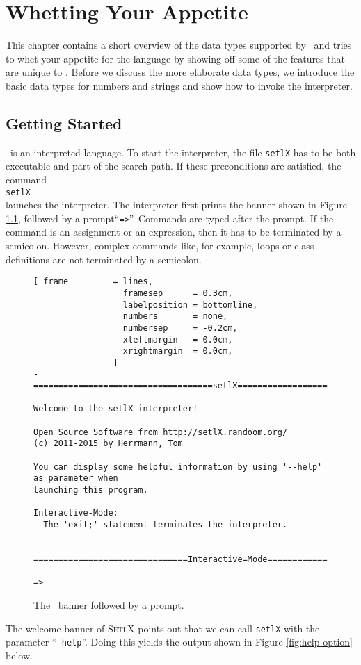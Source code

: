 \chapter{Whetting Your Appetite}
This chapter contains a short overview of the data types supported by
\setlx\ and tries to whet your appetite for the language by showing off some of
the features that are unique to \setlx.  Before we discuss the more elaborate data types,
we introduce the basic data types for numbers and strings and show how to invoke the interpreter.


\section{Getting Started}
\setlx\ is an interpreted language.  To start the interpreter,  the file
\texttt{setlX} has to be both executable and part of the search path.   If these
preconditions are satisfied, the command
\\[0.2cm]
\hspace*{1.3cm}
\texttt{setlX}
\\[0.2cm]
 launches the interpreter.  The interpreter first prints the banner shown in Figure
\ref{fig:banner}, followed by a prompt``\texttt{=>}''.  Commands are typed after the prompt.    
If the command is an assignment or an expression, then it has to be terminated by a semicolon.
However, complex commands like, for example, loops or class definitions are not terminated by 
a semicolon. 

\begin{figure}[!ht]
\centering
\begin{Verbatim}[ frame         = lines, 
                  framesep      = 0.3cm, 
                  labelposition = bottomline,
                  numbers       = none,
                  numbersep     = -0.2cm,
                  xleftmargin   = 0.0cm,
                  xrightmargin  = 0.0cm,
                ]
-====================================setlX=============================v2.4.0=-

Welcome to the setlX interpreter!

Open Source Software from http://setlX.randoom.org/
(c) 2011-2015 by Herrmann, Tom

You can display some helpful information by using '--help' as parameter when
launching this program.

Interactive-Mode:
  The 'exit;' statement terminates the interpreter.

-===============================Interactive=Mode==============================-

=> 
\end{Verbatim}
\vspace*{-0.3cm}
\caption{The \setlx\ banner followed by a prompt.}
\label{fig:banner}
\end{figure}
\noindent
The welcome banner of \textsc{SetlX} points out that we can call \texttt{setlX} with the parameter 
``\texttt{--help}''.   Doing this yields the output shown in Figure \ref{fig:help-option} below. 

